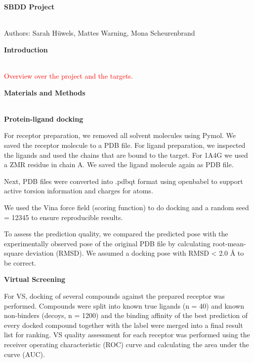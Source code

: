 \documentclass[a4paper,10pt]{article}
\begin{document}


\begin{huge}
	\vspace{1cm}
	\textbf{SBDD Project}
\end{huge} \\

Authors: Sarah Hüwels, Mattes Warning, Mona Scheurenbrand

\begin{large}
	\vspace{0.5cm}
	\textbf{Introduction}
\end{large}	\\ [1mm]

\textcolor{red}{Overview over the project and the targets.}

\begin{large}
	\vspace{0.5cm}
	\textbf{Materials and Methods}
\end{large}	\\ [1mm]

\textbf{Protein-ligand docking}

For receptor preparation, we removed all solvent molecules using Pymol. We saved the receptor molecule to a PDB file.
For ligand preparation, we inspected the ligands and used the chains that are bound to the target. For 1A4G we used a ZMR residue in chain A. We saved the ligand molecule again as PDB file.

Next, PDB files were converted into .pdbqt format using openbabel to support active torsion information and charges for atoms. 

We used the Vina force field (scoring function) to do docking and a random seed = 12345 to ensure reproducible results.

To assess the prediction quality, we compared the predicted pose with the experimentally observed pose of the original PDB file by calculating root-mean-square deviation (RMSD). We assumed a docking pose with RMSD < 2.0 Å to be correct.

\textbf{Virtual Screening}

For VS, docking of several compounds against the prepared receptor was performed. Compounds were split into known true ligands (n = 40) and known non-binders (decoys, n = 1200) and the binding affinity of the best prediction of every docked compound together with the label were merged into a final result list for ranking. 
VS quality assessment for each receptor was performed using the receiver operating characteristic (ROC) curve and calculating the area under the curve (AUC).
\end{document}
